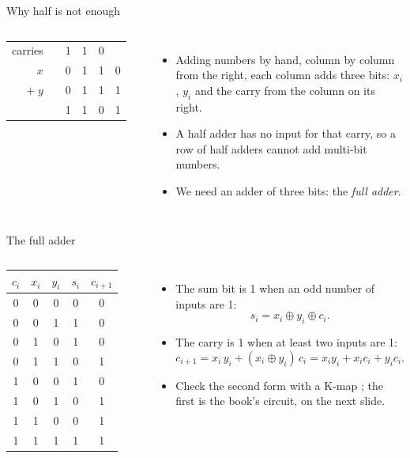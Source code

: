 \documentclass[10pt]{wosm-slides}
\makeatletter
\newcommand*\colsum[4]{%
  \begin{tabular}{@{}r@{\quad}*{5}{c@{\,}}@{}}
    {\scriptsize\color{wosm-brick}carries} & #1 \\
    $x$ & #2 \\
    $+\;y$ & #3 \\
    \midrule
    & #4 \\
  \end{tabular}}
\makeatother
\begin{document}
\begin{frame}{Why half is not enough}
  \begin{columns}[c, totalwidth=\textwidth]
      \centering
      \large
      \colsum{ & 1 & 1 & 0 & }{ & 0 & 1 & 1 & 0}{ & 0 & 1 & 1 & 1}{ & 1 & 1 & 0 & 1}
      \par\medskip
      \normalsize
      \begin{itemize}
        \item Adding numbers by hand, column by column from the right, each column
          adds \alert{three} bits: $x_i$, $y_i$ and the carry from the column on its
          right.
        \item A half adder has no input for that carry, so a row of half adders
          cannot add multi-bit numbers.
        \item We need an adder of three bits: the \emph{full adder}.
      \end{itemize}
  \end{columns}
\end{frame}

\begin{frame}{The full adder}
  \begin{columns}[c, totalwidth=\textwidth]
      \centering
      \begin{tabular}{@{}ccc|cc@{}}
        $c_i$ & $x_i$ & $y_i$ & $s_i$ & $c_{i+1}$ \\
        \midrule
        0 & 0 & 0 & 0 & 0 \\
        0 & 0 & 1 & 1 & 0 \\
        0 & 1 & 0 & 1 & 0 \\
        0 & 1 & 1 & 0 & 1 \\
        1 & 0 & 0 & 1 & 0 \\
        1 & 0 & 1 & 0 & 1 \\
        1 & 1 & 0 & 0 & 1 \\
        1 & 1 & 1 & 1 & 1 \\
      \end{tabular}\par\smallskip
      \begin{itemize}
        \item The sum bit is 1 when an odd number of inputs are 1:
          \[ s_i = x_i \oplus y_i \oplus c_i. \]
        \item The carry is 1 when at least two inputs are 1:
          \[ c_{i+1} = x_i\, y_i + (x_i \oplus y_i)\, c_i
             = x_i y_i + x_i c_i + y_i c_i. \]
        \item Check the second form with a K-map ; the first is the
          book's circuit, on the next slide.
      \end{itemize}
  \end{columns}
\end{frame}
\end{document}
